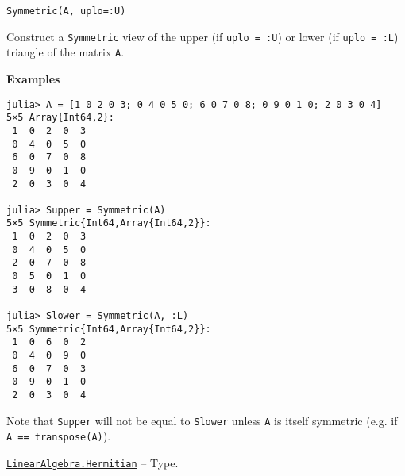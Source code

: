\begin{adjustwidth}{2em}{0pt}


\begin{verbatim}
Symmetric(A, uplo=:U)
\end{verbatim}

Construct a \texttt{Symmetric} view of the upper (if \texttt{uplo = :U}) or lower (if \texttt{uplo = :L}) triangle of the matrix \texttt{A}.

\textbf{Examples}


\begin{verbatim}
julia> A = [1 0 2 0 3; 0 4 0 5 0; 6 0 7 0 8; 0 9 0 1 0; 2 0 3 0 4]
5×5 Array{Int64,2}:
 1  0  2  0  3
 0  4  0  5  0
 6  0  7  0  8
 0  9  0  1  0
 2  0  3  0  4

julia> Supper = Symmetric(A)
5×5 Symmetric{Int64,Array{Int64,2}}:
 1  0  2  0  3
 0  4  0  5  0
 2  0  7  0  8
 0  5  0  1  0
 3  0  8  0  4

julia> Slower = Symmetric(A, :L)
5×5 Symmetric{Int64,Array{Int64,2}}:
 1  0  6  0  2
 0  4  0  9  0
 6  0  7  0  3
 0  9  0  1  0
 2  0  3  0  4
\end{verbatim}

Note that \texttt{Supper} will not be equal to \texttt{Slower} unless \texttt{A} is itself symmetric (e.g. if \texttt{A == transpose(A)}).



\end{adjustwidth}
\hypertarget{938713992181310063}{} 
\hyperlink{938713992181310063}{\texttt{LinearAlgebra.Hermitian}}  -- {Type.}


